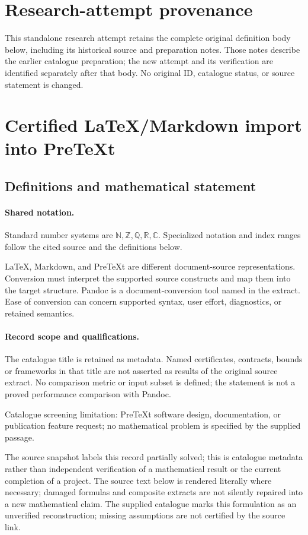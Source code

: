\documentclass[11pt]{article}
\begin{document}
\section*{Research-attempt provenance}
This standalone research attempt retains the complete original definition body below,
including its historical source and preparation notes. Those notes describe the
earlier catalogue preparation; the new attempt and its verification are identified
separately after that body. No original ID, catalogue status, or source statement is changed.

\section{Certified LaTeX/Markdown import into PreTeXt}\label{statement}

\subsection{Definitions and mathematical statement}

\paragraph{Shared notation.}Standard number systems are $\mathbb N,\mathbb Z,\mathbb Q,\mathbb R,\mathbb C$. Specialized notation and index ranges follow the cited source and the definitions below.


LaTeX, Markdown, and PreTeXt are different document-source representations. Conversion must interpret the supported source constructs and map them into the target structure. Pandoc is a document-conversion tool named in the extract. Ease of conversion can concern supported syntax, user effort, diagnostics, or retained semantics.
\paragraph{Record scope and qualifications.}
The catalogue title is retained as metadata. Named certificates, contracts, bounds or frameworks in that title are not asserted as results of the original source extract.
No comparison metric or input subset is defined; the statement is not a proved performance comparison with Pandoc.

Catalogue screening limitation: PreTeXt software design, documentation, or publication feature request; no mathematical problem is specified by the supplied passage.

The source snapshot labels this record partially solved; this is catalogue metadata rather than independent verification of a mathematical result or the current completion of a project.
The source text below is rendered literally where necessary; damaged formulas and composite extracts are not silently repaired into a new mathematical claim.
The supplied catalogue marks this formulation as an unverified reconstruction; missing assumptions are not certified by the source link.
\end{document}
